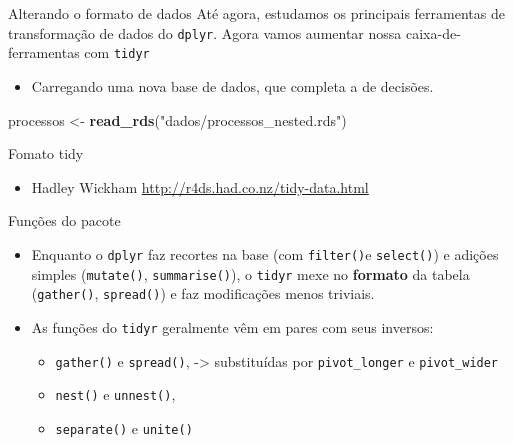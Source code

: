 \documentclass[
  10pt,
  ignorenonframetext,
]{beamer}
\newenvironment{Shaded}{\begin{snugshade}}{\end{snugshade}}
\newcommand{\KeywordTok}[1]{\textcolor[rgb]{0.13,0.29,0.53}{\textbf{#1}}}
\newcommand{\NormalTok}[1]{#1}
\newcommand{\StringTok}[1]{\textcolor[rgb]{0.31,0.60,0.02}{#1}}
\providecommand{\tightlist}{%
  \setlength{\itemsep}{0pt}\setlength{\parskip}{0pt}}
\begin{document}
\begin{frame}[fragile]{Alterando o formato de dados}
\protect\hypertarget{alterando-o-formato-de-dados}{}
Até agora, estudamos os principais ferramentas de transformação de dados
do \texttt{dplyr}. Agora vamos aumentar nossa caixa-de-ferramentas com
\texttt{tidyr}

\begin{itemize}
\tightlist
\item
  Carregando uma nova base de dados, que completa a de decisões.
\end{itemize}

\begin{Shaded}
\begin{Highlighting}[]
\NormalTok{processos \textless{}{-}}\StringTok{ }\KeywordTok{read\_rds}\NormalTok{(}\StringTok{"dados/processos\_nested.rds"}\NormalTok{)}
\end{Highlighting}
\end{Shaded}
\end{frame}

\begin{frame}{Fomato tidy}
\protect\hypertarget{fomato-tidy}{}
\begin{itemize}
\tightlist
\item
  Hadley Wickham \url{http://r4ds.had.co.nz/tidy-data.html}
\end{itemize}
\end{frame}

\begin{frame}[fragile]{Funções do pacote}
\protect\hypertarget{funuxe7uxf5es-do-pacote}{}
\begin{itemize}
\item
  Enquanto o \texttt{dplyr} faz recortes na base (com \texttt{filter()}e
  \texttt{select()}) e adições simples (\texttt{mutate()},
  \texttt{summarise()}), o \texttt{tidyr} mexe no \textbf{formato} da
  tabela (\texttt{gather()}, \texttt{spread()}) e faz modificações menos
  triviais.
\item
  As funções do \texttt{tidyr} geralmente vêm em pares com seus
  inversos:

  \begin{itemize}
  \tightlist
  \item
    \texttt{gather()} e \texttt{spread()}, -\textgreater{} substituídas
    por \texttt{pivot\_longer} e \texttt{pivot\_wider}
  \item
    \texttt{nest()} e \texttt{unnest()},
  \item
    \texttt{separate()} e \texttt{unite()}
  \end{itemize}
\end{itemize}
\end{frame}
\end{document}
